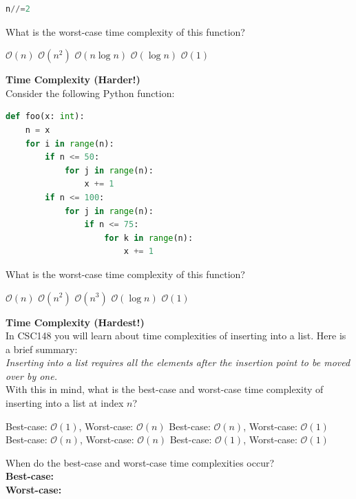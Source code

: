 \documentclass[letterpaper,13pt,addpoints]{exam}
\begin{document}
\begin{questions}
\begin{lstlisting}[language=Python, style=mystyle]
            n//=2
    \end{lstlisting}
    What is the worst-case time complexity of this function?
    \begin{choices}
        \choice $\mathcal{O}(n)$
        \choice $\mathcal{O}(n^2)$
        \choice $\mathcal{O}(n\log n)$
        \choice $\mathcal{O}(\log n)$
        \choice $\mathcal{O}(1)$
    \end{choices}
    \pagebreak
    \question[5] \textbf{Time Complexity (Harder!)} \\
    Consider the following Python function:
    \begin{lstlisting}[language=Python, style=mystyle]
def foo(x: int):
    n = x
    for i in range(n):
        if n <= 50:
            for j in range(n):
                x += 1
        if n <= 100:
            for j in range(n):
                if n <= 75:
                    for k in range(n):
                        x += 1
    \end{lstlisting}
    What is the worst-case time complexity of this function?
    \begin{choices}
        \choice $\mathcal{O}(n)$
        \choice $\mathcal{O}(n^2)$
        \choice $\mathcal{O}(n^3)$
        \choice $\mathcal{O}(\log n)$
        \choice $\mathcal{O}(1)$
    \end{choices}
    \question[5] \textbf{Time Complexity (Hardest!)} \\
    In CSC148 you will learn about time complexities of inserting into a list. Here is a brief summary: \\
    \textit{Inserting into a list requires all the elements after the insertion point to be moved over by one.} \\
    With this in mind, what is the best-case and worst-case time complexity of inserting into a list at index $n$?
    \begin{choices}
        \choice Best-case: $\mathcal{O}(1)$, Worst-case: $\mathcal{O}(n)$
        \choice Best-case: $\mathcal{O}(n)$, Worst-case: $\mathcal{O}(1)$
        \choice Best-case: $\mathcal{O}(n)$, Worst-case: $\mathcal{O}(n)$
        \choice Best-case: $\mathcal{O}(1)$, Worst-case: $\mathcal{O}(1)$
    \end{choices}
    When do the best-case and worst-case time complexities occur? \\
    \textbf{Best-case:} \underline{\hspace{15cm}} \\
    \bigskip
    \textbf{Worst-case:} \underline{\hspace{15cm}} \\


\end{questions}
\end{document}
